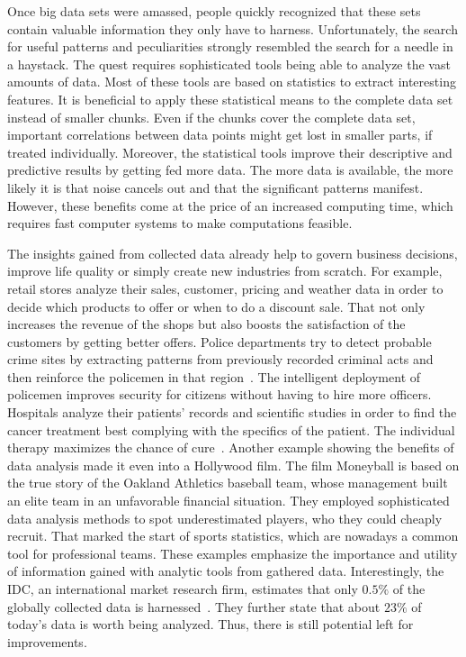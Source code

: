Once big data sets were amassed, people quickly recognized that these sets contain valuable information they only have to harness.
Unfortunately, the search for useful patterns and peculiarities strongly resembled the search for a needle in a haystack.
The quest requires sophisticated tools being able to analyze the vast amounts of data.
Most of these tools are based on statistics to extract interesting features.
It is beneficial to apply these statistical means to the complete data set instead of smaller chunks.
Even if the chunks cover the complete data set, important correlations between data points might get lost in smaller parts, if treated individually.
Moreover, the statistical tools improve their descriptive and predictive results by getting fed more data.
The more data is available, the more likely it is that noise cancels out and that the significant patterns manifest.
However, these benefits come at the price of an increased computing time, which requires fast computer systems to make computations feasible.

The insights gained from collected data already help to govern business decisions, improve life quality or simply create new industries from scratch.
For example, retail stores analyze their sales, customer, pricing and weather data in order to decide which products to offer or when to do a discount sale.
That not only increases the revenue of the shops but also boosts the satisfaction of the customers by getting better offers. 
Police departments try to detect probable crime sites by extracting patterns from previously recorded criminal acts and then reinforce the policemen in that region~\cite{lohr:yt2012a}.
The intelligent deployment of policemen improves security for citizens without having to hire more officers.
Hospitals analyze their patients' records and scientific studies in order to find the cancer treatment best complying with the specifics of the patient.
The individual therapy maximizes the chance of cure~\cite{watson:2013a}.
Another example showing the benefits of data analysis made it even into a Hollywood film.
The film Moneyball is based on the true story of the Oakland Athletics baseball team, whose management built an elite team in an unfavorable financial situation.
They employed sophisticated data analysis methods to spot underestimated players, who they could cheaply recruit.
That marked the start of sports statistics, which are nowadays a common tool for professional teams.
These examples emphasize the importance and utility of information gained with analytic tools from gathered data.
Interestingly, the IDC, an international market research firm, estimates that only $0.5\%$ of the globally collected data is harnessed~\cite{gantz:iaf2012a}.
They further state that about $23\%$ of today's data is worth being analyzed.
Thus, there is still potential left for improvements.

